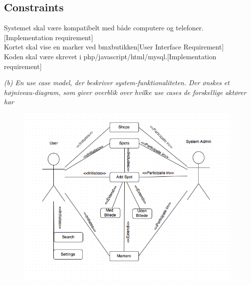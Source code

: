 \documentclass[12pt]{article}
\begin{document}
\subsection*{Constraints}
Systemet skal være kompatibelt med både computere og telefoner.[Implementation requirement]\\
Kortet skal vise en marker ved bmxbutikken[User Interface Requirement]\\
Koden skal være skrevet i php/javascript/html/mysql.[Implementation requirement]\\

\pagebreak

\textit{(b) En use case model, der beskriver system-funktionaliteten. Der ønskes et højniveau-diagram,
som giver overblik over hvilke use cases de forskellige aktører har}\\
\begin{figure}[htb]
\includegraphics[scale = 0.75]{UM}
\end{figure}
\end{document}
